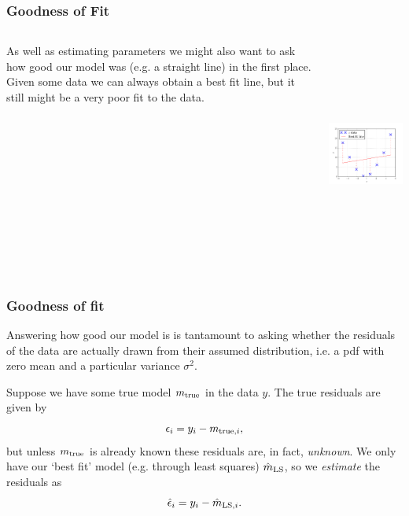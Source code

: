 \begin{frame}

\frametitle{Goodness of Fit}
\label{goodnessoffit}

\begin{columns}
\begin{column}{0.35\textwidth}

As well as estimating parameters we might also want to ask how good our model was
(e.g. a straight line) in the first place. Given some data we can always obtain a best fit line, but it still
might be a very poor fit to the data.
\end{column}
\begin{column}{0.65\textwidth}
\includegraphics[keepaspectratio,width=\textwidth,height=210pt]{figures/quadratic_data.pdf}
\end{column}
\end{columns}

\end{frame}

\begin{frame}

\frametitle{Goodness of fit}
\label{goodnessoffit}

Answering how good our model is is tantamount to asking whether the residuals of the data are actually
drawn from their assumed distribution, i.e. a pdf with zero mean and a particular variance $\sigma^2$.

Suppose we have some true model $m_{\rm true}$ in the data $y$. The true residuals are given by
\[
\epsilon_i = y_i - m_{{\rm true},i},
\]
but unless $m_{\rm true}$ is already known these residuals are, in fact, \emph{unknown}. We only have our
`best fit' model (e.g. through least squares) $\hat{m}_{\rm LS}$, so we \emph{estimate} the residuals as
\[
\hat{\epsilon}_i = y_i - \hat{m}_{{\rm LS},i}.
\]

\end{frame}

